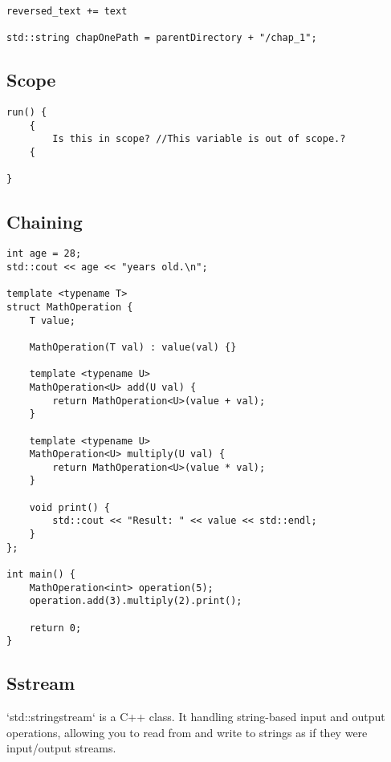 \documentclass[openany]{report}
\begin{document}
\begin{verbatim}
reversed_text += text

std::string chapOnePath = parentDirectory + "/chap_1";
\end{verbatim}

\subsection{Scope}

\begin{verbatim}
run() {
    {
        Is this in scope? //This variable is out of scope.?
    {
    
}
\end{verbatim}

\subsection{Chaining}

\begin{verbatim}
int age = 28;
std::cout << age << "years old.\n";

template <typename T>
struct MathOperation {
    T value;

    MathOperation(T val) : value(val) {}

    template <typename U>
    MathOperation<U> add(U val) {
        return MathOperation<U>(value + val);
    }

    template <typename U>
    MathOperation<U> multiply(U val) {
        return MathOperation<U>(value * val);
    }

    void print() {
        std::cout << "Result: " << value << std::endl;
    }
};

int main() {
    MathOperation<int> operation(5);
    operation.add(3).multiply(2).print();

    return 0;
}
\end{verbatim}

\subsection{Sstream}

`std::stringstream` is a C++ class. It handling string-based input and output operations,
allowing you to read from and write to strings as if they were input/output streams.
\end{document}
